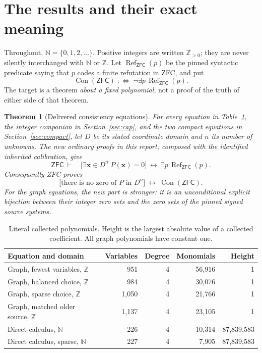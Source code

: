 \documentclass[11pt,letterpaper]{article}
\newtheorem{theorem}{Theorem}[section]
\theoremstyle{definition}\newtheorem{definition}[theorem]{Definition}
\theoremstyle{remark}\newtheorem{remark}[theorem]{Remark}
\newcommand{\Z}{\mathbb Z}\newcommand{\N}{\mathbb N}
\newcommand{\Con}{\operatorname{Con}}\newcommand{\ZFC}{\mathsf{ZFC}}
\newcommand{\Refut}{\operatorname{Ref}}\newcommand{\Ht}{\operatorname{ht}}
\begin{document}
\section{The results and their exact meaning}

Throughout, \(\N=\{0,1,2,\ldots\}\). Positive integers are written
\(\Z_{>0}\); they are never silently interchanged with \(\N\) or \(\Z\).
Let \(\Refut_{\ZFC}(p)\) be the pinned syntactic predicate saying that
\(p\) codes a finite refutation in ZFC, and put
\[
 \Con(\ZFC)\;:\Longleftrightarrow\;\neg\exists p\,\Refut_{\ZFC}(p).
\]
The target is a theorem \emph{about a fixed polynomial}, not a proof of
the truth of either side of that theorem.

\begin{theorem}[Delivered consistency equations]\label{thm:main}
For every equation in Table~\ref{tab:results}, the integer companion in
Section~\ref{sec:cap}, and the two compact equations in
Section~\ref{sec:compact}, let \(D\) be its stated coordinate domain and
\(n\) its number of unknowns. The new ordinary proofs in this report,
composed with the
identified inherited calibration, give
\[
 \ZFC\ \vdash\quad
 \bigl[\exists\mathbf x\in D^n\;P(\mathbf x)=0\bigr]
 \ \longleftrightarrow\ \exists p\,\Refut_{\ZFC}(p).
\]
Consequently ZFC proves
\[
 \boxed{\bigl[\text{there is no zero of }P\text{ in }D^n\bigr]
       \ \longleftrightarrow\ \Con(\ZFC).}
\]
For the graph equations, the new part is stronger: it is an unconditional
explicit bijection between their integer zero sets and the zero sets of
the pinned signed source systems.
\end{theorem}

\begin{table}[ht]
\centering\small
\begin{tabular}{@{}lrrrr@{}}
\toprule
Equation and domain & Variables & Degree & Monomials & Height\\
\midrule
Graph, fewest variables, \(\Z\) & 951 & 4 & 56,916 & 1\\
Graph, balanced choice, \(\Z\) & 984 & 4 & 30,076 & 1\\
Graph, sparse choice, \(\Z\) & 1,050 & 4 & 21,766 & 1\\
Graph, matched older source, \(\Z\) & 1,137 & 4 & 23,105 & 1\\
Direct calculus, \(\N\) & 226 & 4 & 10,314 & 87,839,583\\
Direct calculus, sparse, \(\N\) & 227 & 4 & 7,905 & 87,839,583\\
\bottomrule
\end{tabular}
\caption{Literal collected polynomials. Height is the largest absolute
value of a collected coefficient. All graph polynomials have constant one.}
\label{tab:results}
\end{table}
\end{document}
